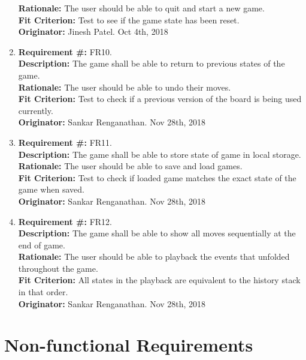 \documentclass[12pt, titlepage]{article}
\renewcommand{\bf}{\textbf}
\begin{document}
\begin{enumerate}
	      \bf{Rationale:} The user should be able to quit and start a new game.\\
	      \bf{Fit Criterion:} Test to see if the game state has been reset.\\
	      \bf{Originator:} Jinesh Patel. Oct 4th, 2018
	\color{blue}
	\item \bf{Requirement \#:} FR10.\\
	      \bf{Description:} The game shall be able to return to previous states of the game.\\
	      \bf{Rationale:} The user should be able to undo their moves.\\
	      \bf{Fit Criterion:} Test to check if a previous version of the board is being used currently.\\
	      \bf{Originator:} Sankar Renganathan. Nov 28th, 2018\\
	\item \bf{Requirement \#:} FR11.\\
	      \bf{Description:} The game shall be able to store state of game in local storage.\\
	      \bf{Rationale:} The user should be able to save and load games.\\
	      \bf{Fit Criterion:} Test to check if loaded game matches the exact state of the game when saved.\\
	      \bf{Originator:} Sankar Renganathan. Nov 28th, 2018\\
	\item \bf{Requirement \#:} FR12.\\
	      \bf{Description:} The game shall be able to show all moves sequentially at the end of game.\\
	      \bf{Rationale:} The user should be able to playback the events that unfolded throughout the game.\\
	      \bf{Fit Criterion:} All states in the playback are equivalent to the history stack in that order.\\
	      \bf{Originator:} Sankar Renganathan. Nov 28th, 2018\\
\end{enumerate}

\section{Non-functional Requirements}
\end{document}
